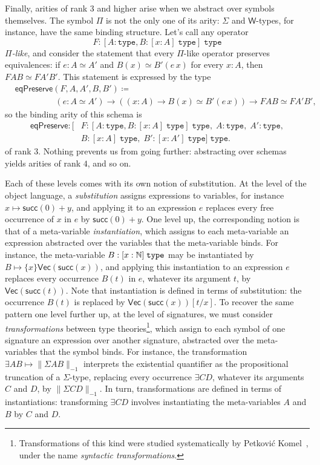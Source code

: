 Finally, arities of rank $3$ and higher arise when we abstract over symbols themselves. The symbol $\Pi$ is not the only one of its arity: $\Sigma$ and $\mathsf{W}$-types, for instance, have the same binding structure. Let's call any operator
$$F : [A : \texttt{type}, B : [x : A] \; \texttt{type}] \; \texttt{type}$$
\emph{$\Pi$-like}, and consider the statement that every $\Pi$-like operator preserves equivalences: if $e : A \simeq A'$ and $B(x) \simeq B'(e\,x)$ for every $x : A$, then $F A B \simeq F A' B'$. This statement is expressed by the type
\begin{align*}
    &\mathsf{eqPreserve}(F, A, A', B, B') \coloneqq\\
    &\hspace{2cm}(e : A \simeq A') \to ((x : A) \to B(x) \simeq B'(e\,x)) \to F A B \simeq F A' B',
\end{align*}
so the binding arity of this schema is
\begin{align*}
\mathsf{eqPreserve} : [&F : [A : \texttt{type}, B : [x : A] \; \texttt{type}] \; \texttt{type},\; A : \texttt{type},\; A' : \texttt{type},\\
&B : [x : A] \; \texttt{type},\; B' : [x : A'] \; \texttt{type}] \; \texttt{type}.
\end{align*}
of rank $3$. Nothing prevents us from going further: abstracting over schemas yields arities of rank $4$, and so on.

Each of these levels comes with its own notion of substitution. At the level of the object language, a \emph{substitution} assigns expressions to variables, for instance $x \mapsto \mathsf{succ}(0) + y$, and applying it to an expression $e$ replaces every free occurrence of $x$ in $e$ by $\mathsf{succ}(0) + y$. One level up, the corresponding notion is that of a meta-variable \emph{instantiation}, which assigns to each meta-variable an expression abstracted over the variables that the meta-variable binds. For instance, the meta-variable $B : [x : \mathbb{N}] \; \texttt{type}$ may be instantiated by $B \mapsto \{x\}\mathsf{Vec}(\mathsf{succ}(x))$, and applying this instantiation to an expression $e$ replaces every occurrence $B(t)$ in $e$, whatever its argument $t$, by $\mathsf{Vec}(\mathsf{succ}(t))$. Note that instantiation is defined in terms of substitution: the occurrence $B(t)$ is replaced by $\mathsf{Vec}(\mathsf{succ}(x))[t/x]$. To recover the same pattern one level further up, at the level of signatures, we must consider \emph{transformations} between type theories\footnote{Transformations of this kind were studied systematically by Petković Komel~\cite[Ch.~8]{PetkovicKomel2021}, under the name \emph{syntactic transformations}.}, which assign to each symbol of one signature an expression over another signature, abstracted over the meta-variables that the symbol binds. For instance, the transformation $\exists A B \mapsto \lVert \Sigma A B \rVert_{-1}$ interprets the existential quantifier as the propositional truncation of a $\Sigma$-type, replacing every occurrence $\exists C D$, whatever its arguments $C$ and $D$, by $\lVert \Sigma C D \rVert_{-1}$. In turn, transformations are defined in terms of instantiations: transforming $\exists C D$ involves instantiating the meta-variables $A$ and $B$ by $C$ and $D$.

